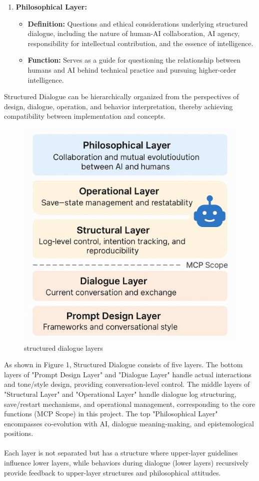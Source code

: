 \documentclass[11pt]{article}
\begin{document}
\begin{enumerate}
\item \textbf{Philosophical Layer:}
\begin{itemize}
\item \textbf{Definition:} Questions and ethical considerations underlying structured dialogue, including the nature of human-AI collaboration, AI agency, responsibility for intellectual contribution, and the essence of intelligence.
\item \textbf{Function:} Serves as a guide for questioning the relationship between humans and AI behind technical practice and pursuing higher-order intelligence.
\end{itemize}
\end{enumerate}
Structured Dialogue can be hierarchically organized from the perspectives of design, dialogue, operation, and behavior interpretation, thereby achieving compatibility between implementation and concepts. \\

\begin{figure}[!htbp]
    \centering
    \includegraphics[width=0.8\linewidth]{structured_dialogue_layers_en.png}
    \caption{structured dialogue layers}
    \label{structured_dialogue_layers}
\end{figure}
\noindent
As shown in Figure 1, Structured Dialogue consists of five layers. The bottom layers of "Prompt Design Layer" and "Dialogue Layer" handle actual interactions and tone/style design, providing conversation-level control. The middle layers of "Structural Layer" and "Operational Layer" handle dialogue log structuring, save/restart mechanisms, and operational management, corresponding to the core functions (MCP Scope) in this project. The top "Philosophical Layer" encompasses co-evolution with AI, dialogue meaning-making, and epistemological positions. \\
\\
Each layer is not separated but has a structure where upper-layer guidelines influence lower layers, while behaviors during dialogue (lower layers) recursively provide feedback to upper-layer structures and philosophical attitudes.
\end{document}
